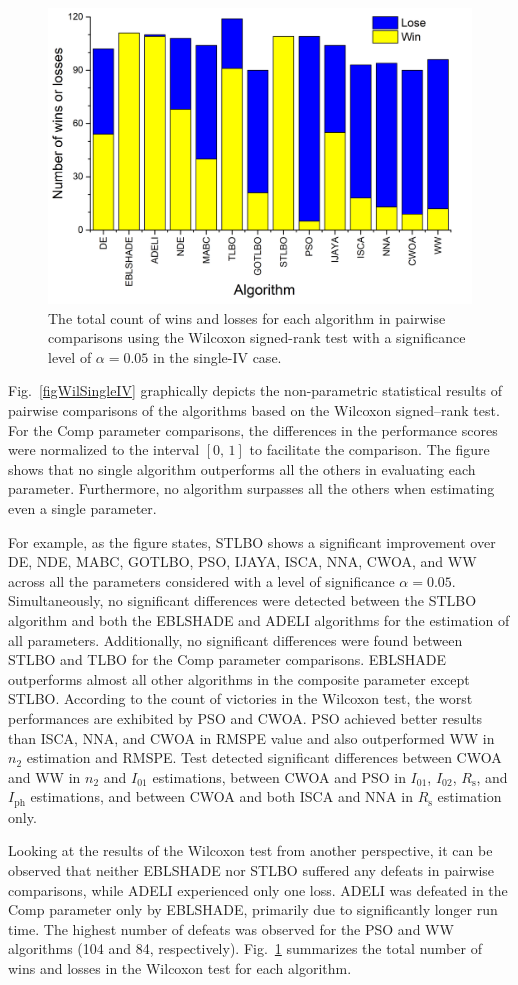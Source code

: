 \documentclass[a4paper,fleqn]{cas-sc}
\begin{document}
\begin{figure}[]
	\centering
		\includegraphics[width=0.45\columnwidth]{Fig6}
	  \caption{The total count of wins and losses for each algorithm in pairwise comparisons using the
               Wilcoxon signed-rank test with a significance level of $\alpha = 0.05$ in the single-IV case.}\label{figWilTotSingleIV}
\end{figure}

Fig.~\ref{figWilSingleIV} graphically depicts 
the non-parametric statistical results of pairwise comparisons of the algorithms 
based on the Wilcoxon signed--rank test. 
For the Comp parameter comparisons, the differences in the performance scores 
were normalized to the interval $[0,\, 1]$ to facilitate the comparison. 
The figure shows that no single algorithm outperforms all the others in evaluating each parameter. 
Furthermore, no algorithm surpasses all the others when estimating even a single parameter.


For example, as the figure states, STLBO shows a significant improvement over 
DE, NDE, MABC, GOTLBO, PSO, IJAYA, ISCA, NNA, CWOA, and WW across all the parameters 
considered with a level of significance $\alpha = 0.05$. 
Simultaneously, no significant differences were detected between the STLBO algorithm 
and both the EBLSHADE and ADELI algorithms for the estimation of all parameters. 
Additionally, no significant differences were found between STLBO and TLBO for the Comp parameter comparisons.
EBLSHADE outperforms almost all other algorithms in the composite parameter except STLBO. 
According to the count of victories in the Wilcoxon test, 
the worst performances are exhibited by PSO and CWOA. 
PSO achieved better results than ISCA, NNA, and CWOA in RMSPE value and 
also outperformed WW in $n_2$ estimation and RMSPE.
Test detected significant differences between CWOA and WW in $n_2$ and $I_{01}$ estimations,
between CWOA and PSO in $I_{01}$, $I_{02}$, $R_\mathrm{s}$, and $I_\mathrm{ph}$ estimations,
and between CWOA and both ISCA and NNA in $R_\mathrm{s}$  estimation only.

Looking at the results of the Wilcoxon test from another perspective, 
it can be observed that neither EBLSHADE nor STLBO suffered any defeats in pairwise comparisons, 
while ADELI experienced only one loss.
ADELI was defeated in the Comp parameter only by  EBLSHADE, 
primarily due to significantly longer run time. 
The highest number of defeats was observed for the PSO and WW algorithms 
(104 and 84, respectively). 
Fig.~\ref{figWilTotSingleIV} summarizes the total number of wins and losses in the Wilcoxon test for each algorithm.
\end{document}
